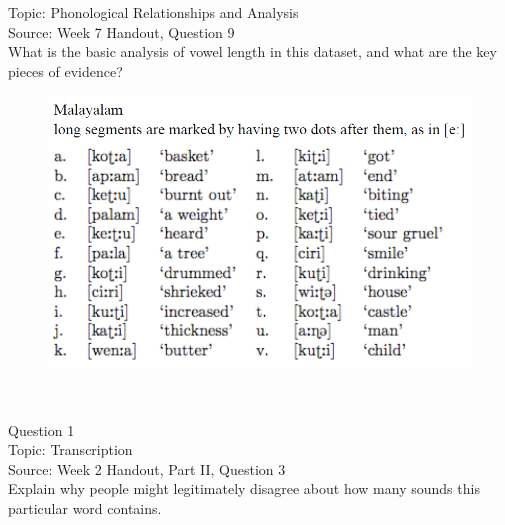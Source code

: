 \documentclass[12pt]{article}
\begin{document}
Topic: Phonological Relationships and Analysis\\
Source: Week 7 Handout, Question 9\\

What is the basic analysis of vowel length in this dataset, and what are the key pieces of evidence?\\

\begin{figure}[H]
\includegraphics{../images/malayalam.png}
\end{figure}

\newpage

\begin{center}
\textbf{{\color{red}{\HUGE END OF EXAM}}}\\

\end{center}
\newpage

\begin{center}
\textbf{{\color{blue}{\HUGE START OF EXAM\\}}}

\textbf{{\color{blue}{\HUGE Student ID: 16758\\}}}

\textbf{{\color{blue}{\HUGE \\}}}

\end{center}
\newpage

{\large Question 1}\\

Topic: Transcription\\
Source: Week 2 Handout, Part II, Question 3\\

Explain why people might legitimately disagree about how many sounds this particular word contains.\\
\end{document}
